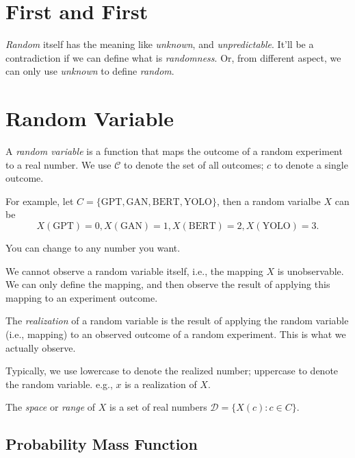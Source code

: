 \documentclass{article}
\begin{document}
    \section*{First and First}

        \textit{Random} itself has the meaning like \textit{unknown}, and
        \textit{unpredictable}. It'll be a contradiction if we can define
        what is \textit{randomness}. Or, from different aspect, we can only use
        \textit{unknown} to define \textit{random}.

    \section{Random Variable}

        A \textit{random variable} is a function that maps the outcome of a
        random experiment to a real number. We use $ \mathcal{C} $ to
        denote the set of all outcomes; $ c $ to denote a single outcome.

        For example, let $ C =  \{ \text{GPT}, \text{GAN}, \text{BERT},
        \text{YOLO} \} $, then a random varialbe $ X $ can be
        \begin{equation*}
             X(\text{GPT}) = 0, X(\text{GAN}) = 1, X(\text{BERT}) = 2,
             X(\text{YOLO}) = 3.
        \end{equation*}

        You can change to any number you want.

        We cannot observe a random variable itself, i.e., the mapping $ X $
        is unobservable. We can only define the mapping, and then observe
        the result of applying this mapping to an experiment outcome.

        The \textit{realization} of a random variable is the result of
        applying the random variable (i.e., mapping) to an observed outcome
        of a random experiment. This is what we actually observe.

        Typically, we use lowercase to denote the realized number;
        uppercase to denote the random variable. e.g., $ x $ is a
        realization of $ X $.

        The \textit{space} or \textit{range} of $ X $ is a set of real
        numbers $ \mathcal{D} = \{ X(c): c \in C \} $.

        \subsection{Probability Mass Function}
\end{document}
